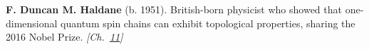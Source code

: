 \nobelphysics \textbf{F. Duncan M. Haldane} (b. 1951). British-born physicist who showed that one-dimensional quantum spin chains can exhibit topological properties, sharing the 2016 Nobel Prize. \emph{[Ch.~\hyperref[ch:topologicalinsulators]{11}]}

